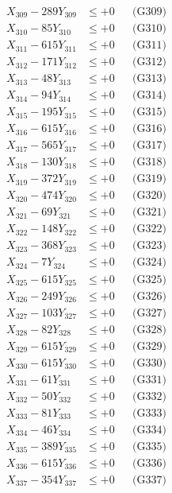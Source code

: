 \documentclass[a4paper,10pt]{article}
\begin{document}
{\begin{align}
X_{309} - 289Y_{309} &\leq +0 && \text{(G309)} \\
X_{310} - 85Y_{310} &\leq +0 && \text{(G310)} \\
\allowbreak
X_{311} - 615Y_{311} &\leq +0 && \text{(G311)} \\
X_{312} - 171Y_{312} &\leq +0 && \text{(G312)} \\
X_{313} - 48Y_{313} &\leq +0 && \text{(G313)} \\
X_{314} - 94Y_{314} &\leq +0 && \text{(G314)} \\
X_{315} - 195Y_{315} &\leq +0 && \text{(G315)} \\
X_{316} - 615Y_{316} &\leq +0 && \text{(G316)} \\
X_{317} - 565Y_{317} &\leq +0 && \text{(G317)} \\
X_{318} - 130Y_{318} &\leq +0 && \text{(G318)} \\
X_{319} - 372Y_{319} &\leq +0 && \text{(G319)} \\
X_{320} - 474Y_{320} &\leq +0 && \text{(G320)} \\
\allowbreak
X_{321} - 69Y_{321} &\leq +0 && \text{(G321)} \\
X_{322} - 148Y_{322} &\leq +0 && \text{(G322)} \\
X_{323} - 368Y_{323} &\leq +0 && \text{(G323)} \\
X_{324} - 7Y_{324} &\leq +0 && \text{(G324)} \\
X_{325} - 615Y_{325} &\leq +0 && \text{(G325)} \\
X_{326} - 249Y_{326} &\leq +0 && \text{(G326)} \\
X_{327} - 103Y_{327} &\leq +0 && \text{(G327)} \\
X_{328} - 82Y_{328} &\leq +0 && \text{(G328)} \\
X_{329} - 615Y_{329} &\leq +0 && \text{(G329)} \\
X_{330} - 615Y_{330} &\leq +0 && \text{(G330)} \\
\allowbreak
X_{331} - 61Y_{331} &\leq +0 && \text{(G331)} \\
X_{332} - 50Y_{332} &\leq +0 && \text{(G332)} \\
X_{333} - 81Y_{333} &\leq +0 && \text{(G333)} \\
X_{334} - 46Y_{334} &\leq +0 && \text{(G334)} \\
X_{335} - 389Y_{335} &\leq +0 && \text{(G335)} \\
X_{336} - 615Y_{336} &\leq +0 && \text{(G336)} \\
X_{337} - 354Y_{337} &\leq +0 && \text{(G337)} \\

\end{align}}
\end{document}
